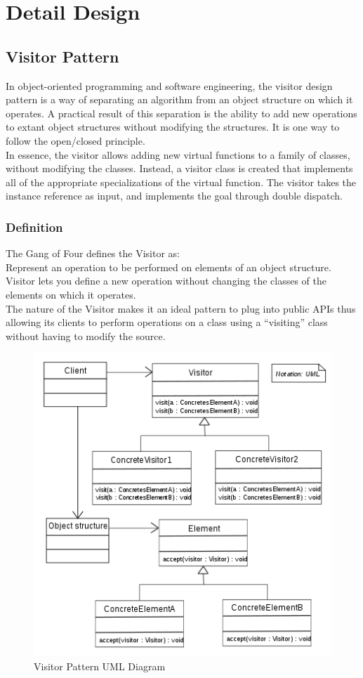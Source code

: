 \section{Detail Design}
\subsection{Visitor Pattern}
In object-oriented programming and software engineering, the visitor design pattern is a way of separating an algorithm from an object structure on which it operates. A practical result of this separation is the ability to add new operations to extant object structures without modifying the structures. It is one way to follow the open/closed principle.\\
In essence, the visitor allows adding new virtual functions to a family of classes, without modifying the classes. Instead, a visitor class is created that implements all of the appropriate specializations of the virtual function. The visitor takes the instance reference as input, and implements the goal through double dispatch.
\subsubsection{Definition}
The Gang of Four defines the Visitor as:\\
Represent an operation to be performed on elements of an object structure. Visitor lets you define a new operation without changing the classes of the elements on which it operates.\\
The nature of the Visitor makes it an ideal pattern to plug into public APIs thus allowing its clients to perform operations on a class using a “visiting” class without having to modify the source.
\begin{figure}
	\centering
	\includegraphics[width=\linewidth]{images/Visitor_design_pattern}
	\caption{Visitor Pattern UML Diagram}
	\label{fig:visitordesignpattern}
\end{figure}

